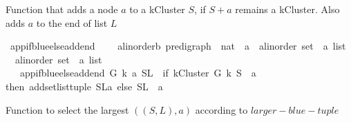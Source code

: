 \begin{isabellebody}
\begin{isamarkuptext}%
Function that adds a node $a$ to a kCluster $S$, if $S + {a}$ remains a kCluster.
    Also adds $a$ to the end of list $L$%
\end{isamarkuptext}\isamarkuptrue%
\isamarkupfalse%
\ app{\isacharunderscore}{\kern0pt}if{\isacharunderscore}{\kern0pt}blue{\isacharunderscore}{\kern0pt}else{\isacharunderscore}{\kern0pt}add{\isacharunderscore}{\kern0pt}end\ {\isacharcolon}{\kern0pt}{\isacharcolon}{\kern0pt}\ \isanewline
\ \ {\isachardoublequoteopen}{\isacharparenleft}{\kern0pt}{\isacharprime}{\kern0pt}a{\isacharcolon}{\kern0pt}{\isacharcolon}{\kern0pt}linorder{\isacharcomma}{\kern0pt}{\isacharprime}{\kern0pt}b{\isacharparenright}{\kern0pt}\ pre{\isacharunderscore}{\kern0pt}digraph\ {\isasymRightarrow}\ nat\ {\isasymRightarrow}\ {\isacharprime}{\kern0pt}a\ {\isasymRightarrow}\ {\isacharparenleft}{\kern0pt}{\isacharprime}{\kern0pt}a{\isacharcolon}{\kern0pt}{\isacharcolon}{\kern0pt}linorder\ set\ {\isasymtimes}\ {\isacharprime}{\kern0pt}a\ list{\isacharparenright}{\kern0pt}\isanewline
\ {\isasymRightarrow}\ {\isacharparenleft}{\kern0pt}{\isacharprime}{\kern0pt}a{\isacharcolon}{\kern0pt}{\isacharcolon}{\kern0pt}linorder\ set\ {\isasymtimes}\ {\isacharprime}{\kern0pt}a\ list{\isacharparenright}{\kern0pt}{\isachardoublequoteclose}\ \ \isanewline
\ \ \ {\isachardoublequoteopen}app{\isacharunderscore}{\kern0pt}if{\isacharunderscore}{\kern0pt}blue{\isacharunderscore}{\kern0pt}else{\isacharunderscore}{\kern0pt}add{\isacharunderscore}{\kern0pt}end\ G\ k\ a\ {\isacharparenleft}{\kern0pt}S{\isacharcomma}{\kern0pt}L{\isacharparenright}{\kern0pt}\ {\isacharequal}{\kern0pt}\ {\isacharparenleft}{\kern0pt}if\ {\isacharparenleft}{\kern0pt}kCluster\ G\ k\ {\isacharparenleft}{\kern0pt}S\ {\isasymunion}\ {\isacharbraceleft}{\kern0pt}a{\isacharbraceright}{\kern0pt}{\isacharparenright}{\kern0pt}{\isacharparenright}{\kern0pt}\ \isanewline
then\ add{\isacharunderscore}{\kern0pt}set{\isacharunderscore}{\kern0pt}list{\isacharunderscore}{\kern0pt}tuple\ {\isacharparenleft}{\kern0pt}{\isacharparenleft}{\kern0pt}S{\isacharcomma}{\kern0pt}L{\isacharparenright}{\kern0pt}{\isacharcomma}{\kern0pt}a{\isacharparenright}{\kern0pt}\ else\ {\isacharparenleft}{\kern0pt}S{\isacharcomma}{\kern0pt}L\ {\isacharat}{\kern0pt}\ {\isacharbrackleft}{\kern0pt}a{\isacharbrackright}{\kern0pt}{\isacharparenright}{\kern0pt}{\isacharparenright}{\kern0pt}{\isachardoublequoteclose}%
\begin{isamarkuptext}%
Function to select the largest $((S,L),a)$ according to $larger-blue-tuple$%

\end{isamarkuptext}
\end{isabellebody}
